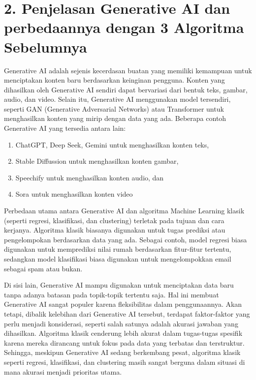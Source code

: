 \documentclass[a4paper]{article}
\begin{document}
\section*{2. Penjelasan Generative AI dan perbedaannya dengan 3 Algoritma Sebelumnya}

Generative AI adalah sejenis kecerdasan buatan yang memiliki kemampuan untuk menciptakan konten baru berdasarkan keinginan pengguna. Konten yang dihasilkan oleh Generative AI sendiri dapat bervariasi dari bentuk teks, gambar, audio, dan video. Selain itu, Generative AI menggunakan model tersendiri, seperti GAN (Generative Adversarial Networks) atau Transformer untuk menghasilkan konten yang mirip dengan data yang ada. Beberapa contoh Generative AI yang tersedia antara lain:

\begin{enumerate}
    \item ChatGPT, Deep Seek, Gemini untuk menghasilkan konten teks,
    \item Stable Diffussion untuk menghasilkan konten gambar,
    \item Speechify untuk menghasilkan konten audio, dan
    \item Sora untuk menghasilkan konten video
\end{enumerate}

Perbedaan utama antara Generative AI dan algoritma Machine Learning klasik (seperti regresi, klasifikasi, dan clustering) terletak pada tujuan dan cara kerjanya. Algoritma klasik biasanya digunakan untuk tugas prediksi atau pengelompokan berdasarkan data yang ada. Sebagai contoh, model regresi biasa digunakan untuk memprediksi nilai rumah berdasarkan fitur-fitur tertentu, sedangkan model klasifikasi biasa digunakan untuk mengelompokkan email sebagai spam atau bukan.

Di sisi lain, Generative AI mampu digunakan untuk menciptakan data baru tanpa adanya batasan pada topik-topik tertentu saja. Hal ini membuat Generative AI sangat populer karena fleksibilitas dalam penggunaannya. Akan tetapi, dibalik kelebihan dari Generative AI tersebut, terdapat faktor-faktor yang perlu menjadi konsiderasi, seperti salah satunya adalah akurasi jawaban yang dihasilkan. Algoritma klasik cenderung lebih akurat dalam tugas-tugas spesifik karena mereka dirancang untuk fokus pada data yang terbatas dan terstruktur. Sehingga, meskipun Generative AI sedang berkembang pesat, algoritma klasik seperti regresi, klasifikasi, dan clustering masih sangat berguna dalam situasi di mana akurasi menjadi prioritas utama.  
\end{document}
